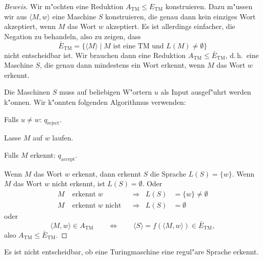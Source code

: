 \begin{proof}[Beweis]
Wir m"ochten eine Reduktion $A_{\text{TM}}\le E_{\text{TM}}$ konstruieren.
Dazu m"ussen wir aus $\langle M,w\rangle$ eine Maschine $S$ konstruieren,
die genau dann kein einziges Wort akzeptiert, wenn $M$ das Wort $w$
akzeptiert. Es ist allerdings einfacher, die Negation zu behandeln,
also zu zeigen, dass 
\[
\bar E_{\text{TM}}=
\{ \langle M\rangle\;|\; \text{$M$ ist eine TM und $L(M)\ne\emptyset$}\}
\]
nicht entscheidbar ist. Wir brauchen dann eine Reduktion
$A_{\text{TM}}\le \bar E_{\text{TM}}$, d.\,h.~eine Maschine $S$,
die genau dann mindestens ein Wort erkennt, wenn $M$ das Wort $w$ 
erkennt.

Die Maschinen $S$ muss auf beliebigen W"ortern $u$ als Input ausgef"uhrt
werden k"onnen. Wir k"onnten folgenden Algorithmus verwenden:
\medskip
\begin{compactenum}
\item Falls $u\ne w$: $q_{\text{reject}}$.
\item Lasse $M$ auf $w$ laufen.
\item Falls $M$ erkennt: $q_{\text{accept}}$.
\end{compactenum}
\medskip
Wenn $M$ das Wort $w$ erkennt, dann erkennt $S$ die Sprache 
$L(S)=\{w\}$. Wenn $M$ das Wort $w$ nicht erkennt, ist $L(S)=\emptyset$.
Oder
\begin{align*}
M&\operatorname{erkennt}w              &&\Rightarrow&L(S)&=\{w\}\ne \emptyset
\\
M&\operatorname{erkennt}w\text{ nicht} &&\Rightarrow&L(S)&=\emptyset
\end{align*}
oder
\[
\langle M,w\rangle \in A_{\text{TM}}
\qquad
\Leftrightarrow
\qquad
\langle S\rangle = f(\langle M,w\rangle)\in
\bar E_{\text{TM}},
\]
also $A_{\text{TM}}\le \bar E_{\text{TM}}$.
\end{proof}

\begin{satz}
Es ist nicht entscheidbar, ob eine Turingmaschine eine regul"are
Sprache erkennt.
\end{satz}

